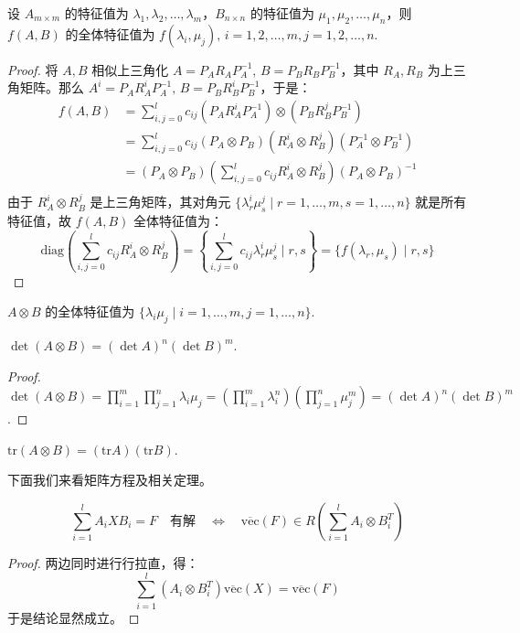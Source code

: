 \begin{theorem}
设 $A_{m\times m}$ 的特征值为 $\lambda_1,\lambda_2,\ldots,\lambda_m$，$B_{n\times n}$ 的特征值为 $\mu_1,\mu_2,\ldots,\mu_n$，则 $f(A,B)$ 的全体特征值为 $f(\lambda_i,\mu_j),\,i=1,2,\ldots,m,j=1,2,\ldots,n$.
\end{theorem}
\begin{proof}
将 $A,B$ 相似上三角化 $A=P_AR_AP_A^{-1},\,B=P_BR_BP_B^{-1}$，其中 $R_A,R_B$ 为上三角矩阵。那么 $A^i=P_AR_A^iP_A^{-1},\,B=P_BR_B^iP_B^{-1}$，于是：
\begin{align*}
    f(A,B)&=\sum_{i,j=0}^lc_{ij}(P_AR_A^iP_A^{-1})\otimes(P_BR_B^jP_B^{-1})\\
    &=\sum_{i,j=0}^lc_{ij}(P_A\otimes P_B)(R_A^i\otimes R_B^j)(P_A^{-1}\otimes P_B^{-1})\\
    &=(P_A\otimes P_B)\left(\sum_{i,j=0}^lc_{ij}R_A^i\otimes R_B^j\right)(P_A\otimes P_B)^{-1}\\
\end{align*}
由于 $R_A^i\otimes R_B^j$ 是上三角矩阵，其对角元 $\{\lambda_r^i\mu_s^j\mid r=1,\ldots,m,s=1,\ldots,n\}$ 就是所有特征值，故 $f(A,B)$ 全体特征值为：
\[
    \text{diag}\left(\sum_{i,j=0}^{l}c_{ij}R_A^i\otimes R_B^j\right)=\left\{\sum_{i,j=0}^lc_{ij}\lambda_r^i\mu_s^j\mid r,s\right\}=\{f(\lambda_r,\mu_s)\mid r,s\}
\]
\end{proof}


\begin{corollary}
$A\otimes B$ 的全体特征值为 $\{\lambda_i\mu_j\mid i=1,\ldots,m,j=1,\ldots,n\}$.
\end{corollary}

\begin{corollary}
$\det(A\otimes B)=(\det A)^n(\det B)^m$.
\end{corollary}
\begin{proof}
$\det(A\otimes B)=\prod_{i=1}^m\prod_{j=1}^n\lambda_i\mu_j=(\prod_{i=1}^m\lambda_i^n)(\prod_{j=1}^n\mu_j^m)=(\det A)^n(\det B)^m$.
\end{proof}

\begin{corollary}
$\text{tr}(A\otimes B)=(\text{tr}A)(\text{tr}B)$.
\end{corollary}

下面我们来看矩阵方程及相关定理。

\begin{theorem}
\[
    \sum_{i=1}^lA_iXB_i=F\quad\text{有解}\quad\iff\quad
    \overline{\text{vec}}(F)\in R\left(\sum_{i=1}^lA_i\otimes B_i^T\right)
\]
\end{theorem}
\begin{proof}
两边同时进行行拉直，得：
\[
    \sum_{i=1}^l(A_i\otimes B_i^T)\overline{\text{vec}}(X)=\overline{\text{vec}}(F)
\]
于是结论显然成立。
\end{proof}

